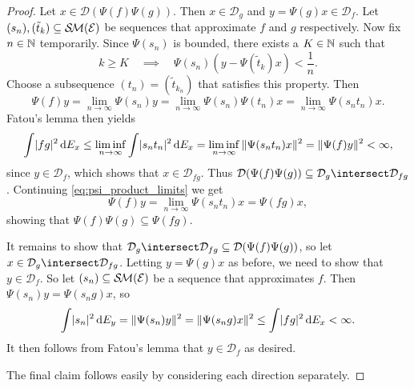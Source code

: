 \documentclass[article, a4paper, 11pt, oneside]{memoir}
\makeatletter
\numberwithin{equation}{chapter}
\newcommand{\calE}{\mathcal{E}}
\newcommand{\dom}{\mathcal{D}}
\theoremstyle{myexample}
\theoremstyle{myexample}
\theoremstyle{myexamplebreak}
\theoremstyle{myexamplebreak}
\theoremstyle{nonumberplain}
\newtheorem{proof}{\protect\@proof}
\theoremstyle{MyNonumberplain}
\newcommand{\@proof}{}
\renewcommand{\@proof}{Proof}%
\renewcommand{\@proof}{Bevis}%
\makeatother
\begin{document}
\begin{proof}
    Let $x \in \dom(\Psi(f) \Psi(g))$. Then $x \in \dom_g$ and $y = \Psi(g)x \in \dom_f$. Let $(s_n), (\tilde t_k) \subseteq \simplemeas(\calE)$ be sequences that approximate $f$ and $g$ respectively. Now fix $n \in \mathbb{N}$ temporarily. Since $\Psi(s_n)$ is bounded, there exists a $K \in \mathbb{N}$ such that
    \begin{equation*}
        k \geq K
        \quad\implies\quad
        \Psi(s_n) (y - \Psi(\tilde t_k) x) < \frac{1}{n}.
    \end{equation*}
    Choose a subsequence $(t_n) = (\tilde t_{k_n})$ that satisfies this property. Then
    \begin{equation}
        \label{eq:psi_product_limits}
        \Psi(f)y
            = \lim_{n \to \infty} \Psi(s_n) y
            = \lim_{n \to \infty} \Psi(s_n) \Psi(t_n) x
            = \lim_{n \to \infty} \Psi(s_n t_n) x.
    \end{equation}
    Fatou's lemma then yields
    \begin{equation*}
        \int \lvert fg\rvert^2 \mathop{}\!\mathrm{d} E_x
            \leq \liminf_{n \to \infty} \int \lvert s_n t_n\rvert^2 \mathop{}\!\mathrm{d} E_x
            = \liminf_{n \to \infty}\, \lVert\Psi(s_n t_n)x\rVert^2
            = \lVert\Psi(f)y\rVert^2
            < \infty,
    \end{equation*}
    since $y \in \dom_f$, which shows that $x \in \dom_{fg}$. Thus $\dom(\Psi(f)\Psi(g)) \subseteq \dom_g \intersect \dom_{fg}$. Continuing \eqref{eq:psi_product_limits} we get
    \begin{equation*}
        \Psi(f)y
            = \lim_{n \to \infty} \Psi(s_n t_n) x
            = \Psi(fg)x,
    \end{equation*}
    showing that $\Psi(f) \Psi(g) \subseteq \Psi(fg)$.
    
    It remains to show that $\dom_g \intersect \dom_{fg} \subseteq \dom(\Psi(f)\Psi(g))$, so let $x \in \dom_g \intersect \dom_{fg}$. Letting $y = \Psi(g)x$ as before, we need to show that $y \in \dom_f$. So let $(s_n) \subseteq \simplemeas(\calE)$ be a sequence that approximates $f$. Then $\Psi(s_n)y = \Psi(s_n g)x$, so
    \begin{equation*}
        \int \lvert s_n\rvert^2 \mathop{}\!\mathrm{d} E_y
            = \lVert\Psi(s_n)y\rVert^2
            = \lVert\Psi(s_n g)x\rVert^2
            \leq \int \lvert fg\rvert^2 \mathop{}\!\mathrm{d} E_x
            < \infty.
    \end{equation*}
    It then follows from Fatou's lemma that $y \in \dom_f$ as desired.
    
    The final claim follows easily by considering each direction separately.
\end{proof}
\end{document}
